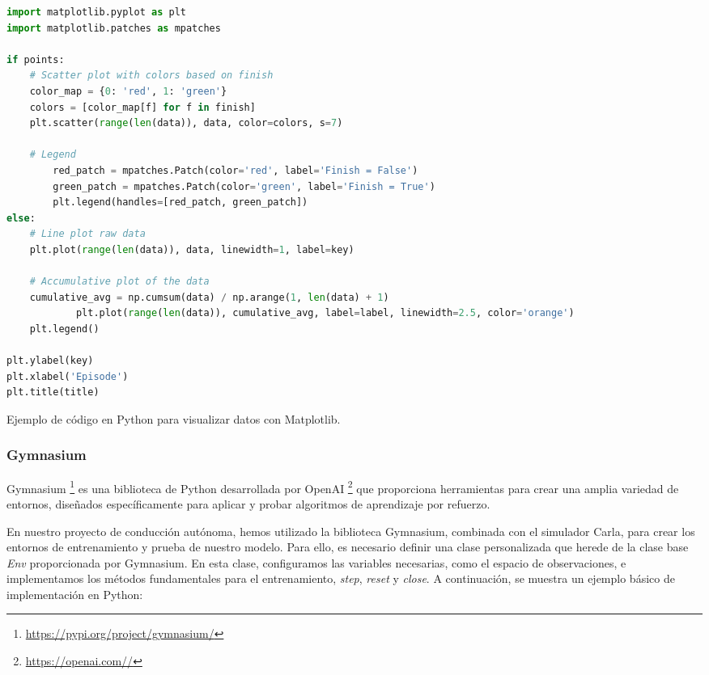 \newpage

\begin{code}[h]
\begin{lstlisting}[language=Python]
import matplotlib.pyplot as plt
import matplotlib.patches as mpatches

if points:
	# Scatter plot with colors based on finish
	color_map = {0: 'red', 1: 'green'}
	colors = [color_map[f] for f in finish] 
	plt.scatter(range(len(data)), data, color=colors, s=7)
	
	# Legend
        red_patch = mpatches.Patch(color='red', label='Finish = False')
        green_patch = mpatches.Patch(color='green', label='Finish = True')
        plt.legend(handles=[red_patch, green_patch])  
else:
	# Line plot raw data
	plt.plot(range(len(data)), data, linewidth=1, label=key)

	# Accumulative plot of the data
	cumulative_avg = np.cumsum(data) / np.arange(1, len(data) + 1)
        	plt.plot(range(len(data)), cumulative_avg, label=label, linewidth=2.5, color='orange')
	plt.legend()

plt.ylabel(key)
plt.xlabel('Episode')
plt.title(title)
\end{lstlisting}
\caption[Ejemplo de código en Python para visualizar datos con Matplotlib]{Ejemplo de código en Python para visualizar datos con Matplotlib.}
\label{cod:plot}
\end{code}

\subsubsection{Gymnasium}
\label{sec:gymnasium}

Gymnasium \footnote{\url{https://pypi.org/project/gymnasium/}}  es una biblioteca de Python desarrollada por OpenAI \footnote{\url{https://openai.com//}}  que proporciona herramientas para crear una amplia variedad de entornos, diseñados específicamente para aplicar y probar algoritmos de aprendizaje por refuerzo.

En nuestro proyecto de conducción autónoma, hemos utilizado la biblioteca Gymnasium, combinada con el simulador Carla, para crear los entornos de entrenamiento y prueba de nuestro modelo. Para ello, es necesario definir una clase personalizada que herede de la clase base \textit{Env} proporcionada por Gymnasium. En esta clase, configuramos las variables necesarias, como el espacio de observaciones, e implementamos los métodos fundamentales para el entrenamiento, \textit{step}, \textit{reset} y \textit{close}. A continuación, se muestra un ejemplo básico de implementación en Python:

